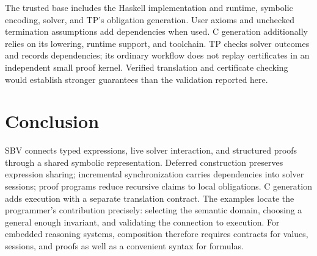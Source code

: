 \documentclass[acmsmall,screen,nonacm]{acmart}
\begin{document}
The trusted base includes the Haskell implementation and runtime, symbolic
encoding, solver, and TP's obligation generation. User axioms and unchecked
termination assumptions add dependencies when used. C generation additionally
relies on its lowering, runtime support, and toolchain. TP checks solver outcomes
and records dependencies; its ordinary workflow does not replay certificates in
an independent small proof kernel. Verified translation and certificate checking
would establish stronger guarantees than the validation reported here.

\section{Conclusion}

SBV connects typed expressions, live solver interaction, and structured proofs
through a shared symbolic representation. Deferred construction preserves
expression sharing; incremental synchronization carries dependencies into solver
sessions; proof programs reduce recursive claims to local obligations. C
generation adds execution with a separate translation contract. The examples
locate the programmer's contribution precisely: selecting the semantic domain,
choosing a general enough invariant, and validating the connection to execution.
For embedded reasoning systems, composition therefore requires contracts for
values, sessions, and proofs as well as a convenient syntax for formulas.



\end{document}
